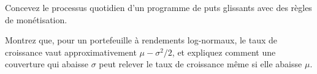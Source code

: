\begin{interviewq}\label{iq:s2:tail-hedging-and-long-volatility:5}
Concevez le processus quotidien d'un programme de puts glissants avec des règles de monétisation.
\end{interviewq}

\begin{interviewq}\label{iq:s2:tail-hedging-and-long-volatility:6}
Montrez que, pour un portefeuille à rendements log-normaux, le taux de croissance vaut approximativement $\mu - \sigma^2/2$, et expliquez comment une couverture qui abaisse $\sigma$ peut
relever le taux de croissance même si elle abaisse $\mu$.
\end{interviewq}
